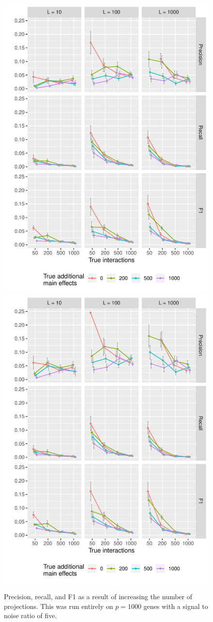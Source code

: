 \begin{figure}
	\begin{minipage}{\linewidth}
	\centering
	\includegraphics[width=0.5\linewidth]{"output/l_diff_n10000_SNR5_tno"}%
	\includegraphics[width=0.5\linewidth]{"output/l_diff_n10000_SNR5_tyes"}
\end{minipage}
\caption{Precision, recall, and F1 as a result of increasing the number of projections. This was run entirely on $p = 1000$ genes with a signal to noise ratio of five.}
\end{figure}

